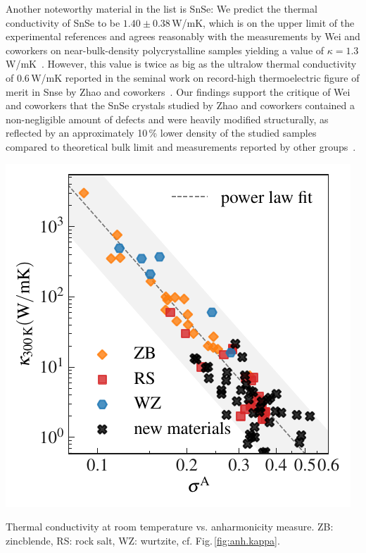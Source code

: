 Another noteworthy material in the list is SnSe: We predict the thermal conductivity of SnSe to be $1.40 \pm 0.38$\,W/mK, which is on the upper limit of the experimental references and agrees reasonably with the measurements by Wei and coworkers on near-bulk-density polycrystalline samples yielding a value of $\kappa = 1.3$\,W/mK~\cite{wei2016}.
However, this value is twice as big as the ultralow thermal conductivity of $0.6$\,W/mK reported in the seminal work on record-high thermoelectric figure of merit in Snse by Zhao and coworkers~\cite{zhao2014}. Our findings support the critique of Wei and coworkers that the SnSe crystals studied by Zhao and coworkers contained a non-negligible amount of defects and were heavily modified structurally, as reflected by an approximately 10\,\% lower density of the studied samples compared to theoretical bulk limit and measurements reported by other groups~\cite{wei2016}.
%
\begin{marginfigure}
	\includegraphics[width=\textwidth]{./data/plots/anharmonicity/9_kappa/incl_computations/sigma_vs_kappa_annot_comp_margin.pdf}
	\caption{
	Thermal conductivity at room temperature vs. anharmonicity measure. ZB: zincblende, RS: rock salt, WZ: wurtzite, cf. Fig.\,\ref{fig:anh.kappa}.}
	\label{fig:kappa_sigma_exp_comp}
\end{marginfigure}
%
